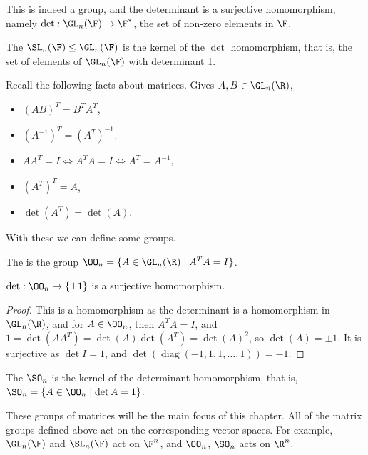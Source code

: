 \documentclass[a4paper]{scrartcl}
\begin{document}
This is indeed a group, and the determinant is a surjective homomorphism, namely $\det : \GL_n(\F) \rightarrow \F^*$, the set of non-zero elements in $\F$.

\begin{definition}
	The  $\SL_n(\F) \leq \GL_n(\F)$ is the kernel of the $\det$ homomorphism, that is, the set of elements of $\GL_n(\F)$ with determinant 1.
\end{definition}

Recall the following facts about matrices. Gives $A, B \in \GL_n(\R)$,
\begin{itemize}
	\item $(AB)^T = B^T A^T$,
	\item $(A^{-1})^T = (A^T)^{-1}$,
	\item $AA^{T} = I \iff A^{T} A = I \iff A^T = A^{-1}$,
	\item $(A^T)^T = A$,
	\item $\det(A^T) = \det(A)$.
\end{itemize}
With these we can define some groups.

\begin{definition}
	The  is the group $\OO_n = \{A \in \GL_n(\R) \mid A^T A = I\}$.
\end{definition}

\begin{proposition}
	$\det : \OO_n \rightarrow \{\pm 1\}$ is a surjective homomorphism. 
\end{proposition}
\begin{proof}
	This is a homomorphism as the determinant is a homomorphism in $\GL_n(\R)$, and for $A \in \OO_n$, then $A^T A = I$, and $1 = \det(A A^T) = \det(A)\det(A^T) = \det(A)^2$, so $\det(A) = \pm 1$. It is surjective as $\det I = 1$, and $\det(\operatorname{diag}(-1, 1, 1, \dots, 1)) = -1$.
\end{proof}

\begin{definition}
	The  $\SO_n$ is the kernel of the determinant homomorphism, that is, $\SO_n = \{A \in \OO_n \mid \det A = 1 \}$.
\end{definition}

These groups of matrices will be the main focus of this chapter.
All of the matrix groups defined above act on the corresponding vector spaces. For example, $\GL_n(\F)$ and $\SL_n(\F)$ act on $\F^n$, and $\OO_n$, $\SO_n$ acts on $\R^n$.
\end{document}
